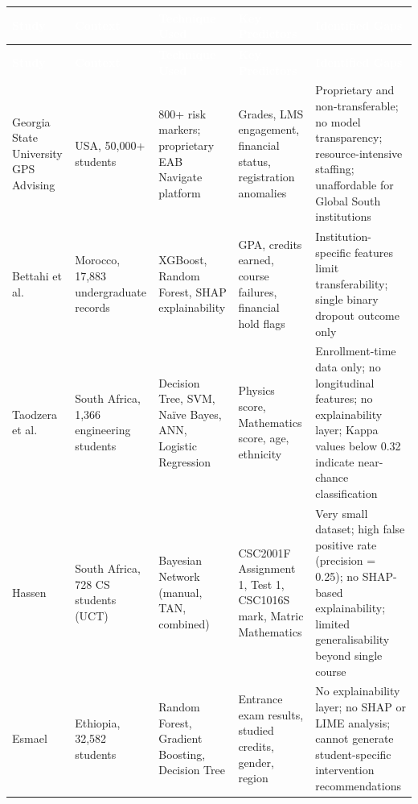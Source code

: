 \documentclass[12pt]{report}
\begin{document}
\begin{longtable}{L{2.4cm} L{2.2cm} L{2.4cm} L{2.4cm} L{3.4cm}}

\textcolor{white}{\textbf{Study}} &
\textcolor{white}{\textbf{Context}} &
\textcolor{white}{\textbf{Technique Used}} &
\textcolor{white}{\textbf{Key Predictors}} &
\textcolor{white}{\textbf{Identified Gaps}} \\
\endfirsthead

\textcolor{white}{\textbf{Study}} &
\textcolor{white}{\textbf{Context}} &
\textcolor{white}{\textbf{Technique Used}} &
\textcolor{white}{\textbf{Key Predictors}} &
\textcolor{white}{\textbf{Identified Gaps}} \\
\endhead

Georgia State University GPS Advising \parencite{GSU2024} &
USA, 50,000+ students &
800+ risk markers; proprietary EAB Navigate platform &
Grades, LMS engagement, financial status, registration anomalies &
Proprietary and non-transferable; no model transparency; resource-intensive staffing; unaffordable for Global South institutions \\[6pt]

Bettahi et al.\ \parencite{bettahi2025} &
Morocco, 17,883 undergraduate records &
XGBoost, Random Forest, SHAP explainability &
GPA, credits earned, course failures, financial hold flags &
Institution-specific features limit transferability; single binary dropout outcome only \\[6pt]

Taodzera et al.\ \parencite{taodzera2016} &
South Africa, 1,366 engineering students &
Decision Tree, SVM, Naïve Bayes, ANN, Logistic Regression &
Physics score, Mathematics score, age, ethnicity &
Enrollment-time data only; no longitudinal features; no explainability layer; Kappa values below 0.32 indicate near-chance classification \\[6pt]

Hassen \parencite{hassen2020} &
South Africa, 728 CS students (UCT) &
Bayesian Network (manual, TAN, combined) &
CSC2001F Assignment 1, Test 1, CSC1016S mark, Matric Mathematics &
Very small dataset; high false positive rate (precision = 0.25); no SHAP-based explainability; limited generalisability beyond single course \\[6pt]

Esmael \parencite{esmael2024} &
Ethiopia, 32,582 students &
Random Forest, Gradient Boosting, Decision Tree &
Entrance exam results, studied credits, gender, region &
No explainability layer; no SHAP or LIME analysis; cannot generate student-specific intervention recommendations \\[6pt]


\end{longtable}
\end{document}
